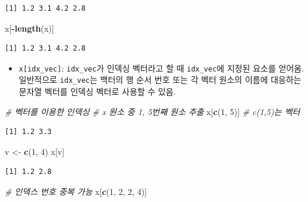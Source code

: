\documentclass[
  11pt,
]{krantz}
\newenvironment{Shaded}{\begin{snugshade}}{\end{snugshade}}
\newcommand{\CommentTok}[1]{\textcolor[rgb]{0.37,0.37,0.37}{\textit{#1}}}
\newcommand{\DecValTok}[1]{\textcolor[rgb]{0.06,0.06,0.06}{#1}}
\newcommand{\KeywordTok}[1]{\textcolor[rgb]{0.27,0.27,0.27}{\textbf{#1}}}
\newcommand{\NormalTok}[1]{#1}
\newcommand{\OperatorTok}[1]{\textcolor[rgb]{0.43,0.43,0.43}{\textbf{#1}}}
\newcommand{\StringTok}[1]{\textcolor[rgb]{0.5,0.5,0.5}{#1}}
\providecommand{\tightlist}{%
  \setlength{\itemsep}{0pt}\setlength{\parskip}{0pt}}
\begin{document}
\begin{verbatim}
[1] 1.2 3.1 4.2 2.8
\end{verbatim}

\begin{Shaded}
\begin{Highlighting}[]
\NormalTok{x[}\OperatorTok{-}\KeywordTok{length}\NormalTok{(x)]}
\end{Highlighting}
\end{Shaded}

\begin{verbatim}
[1] 1.2 3.1 4.2 2.8
\end{verbatim}

\normalsize

\begin{itemize}
\tightlist
\item
  \texttt{x{[}idx\_vec{]}}: \texttt{idx\_vec}가 인덱싱 벡터라고 할 때 \texttt{idx\_vec}에 지정된 요소를 얻어옴. 일반적으로 \texttt{idx\_vec}는 백터의 행 순서 번호 또는 각 벡터 원소의 이름에 대응하는 문자열 벡터를 인덱싱 벡터로 사용할 수 있음.
\end{itemize}

\footnotesize

\begin{Shaded}
\begin{Highlighting}[]
\CommentTok{# 벡터를 이용한 인덱싱}
\CommentTok{# x 원소 중 1, 5번째 원소 추출}
\NormalTok{x[}\KeywordTok{c}\NormalTok{(}\DecValTok{1}\NormalTok{, }\DecValTok{5}\NormalTok{)] }\CommentTok{# c(1,5)는 벡터}
\end{Highlighting}
\end{Shaded}

\begin{verbatim}
[1] 1.2 3.3
\end{verbatim}

\begin{Shaded}
\begin{Highlighting}[]
\NormalTok{v <-}\StringTok{ }\KeywordTok{c}\NormalTok{(}\DecValTok{1}\NormalTok{, }\DecValTok{4}\NormalTok{)}
\NormalTok{x[v]}
\end{Highlighting}
\end{Shaded}

\begin{verbatim}
[1] 1.2 2.8
\end{verbatim}

\begin{Shaded}
\begin{Highlighting}[]
\CommentTok{# 인덱스 번호 중복 가능}
\NormalTok{x[}\KeywordTok{c}\NormalTok{(}\DecValTok{1}\NormalTok{, }\DecValTok{2}\NormalTok{, }\DecValTok{2}\NormalTok{, }\DecValTok{4}\NormalTok{)]}
\end{Highlighting}
\end{Shaded}
\end{document}
